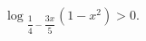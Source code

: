 \begin{ex}[type=inequality]
	\begin{condition}
		$\log$\tiny$_{\dfrac{1}{4} - \dfrac{3x}{5}}$\normalsize$(1 -x^2) > 0.$
	\end{condition}
\end{ex}